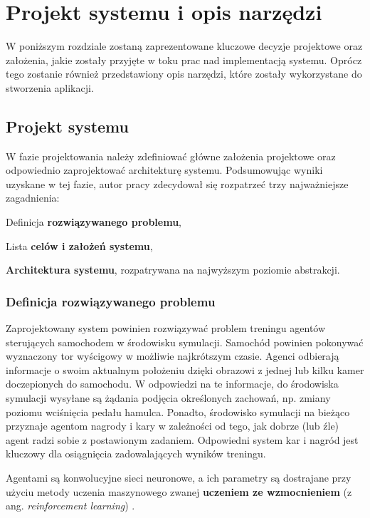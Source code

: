 \chapter{Projekt systemu i opis narzędzi}
\label{DesignSystemChapter}
W poniższym rozdziale zostaną zaprezentowane kluczowe decyzje projektowe oraz założenia, jakie zostały przyjęte w toku prac nad implementacją systemu. Oprócz tego zostanie również przedstawiony opis narzędzi, które zostały wykorzystane do stworzenia aplikacji.

\section{Projekt systemu}
W fazie projektowania należy zdefiniować główne założenia projektowe oraz odpowiednio zaprojektować architekturę systemu. Podsumowując wyniki uzyskane w tej fazie, autor pracy zdecydował się rozpatrzeć trzy najważniejsze zagadnienia:
\begin{enumerate*}
\item Definicja \textbf{rozwiązywanego problemu},
\item Lista \textbf{celów i założeń systemu},
\item \textbf{Architektura systemu}, rozpatrywana na najwyższym poziomie abstrakcji.
\end{enumerate*}

\subsection{Definicja rozwiązywanego problemu}
Zaprojektowany system powinien rozwiązywać problem treningu agentów sterujących samochodem w środowisku symulacji. Samochód powinien pokonywać wyznaczony tor wyścigowy w możliwie najkrótszym czasie. Agenci odbierają informacje o swoim aktualnym położeniu dzięki obrazowi z jednej lub kilku kamer doczepionych do samochodu. W odpowiedzi na te informacje, do środowiska symulacji wysyłane są żądania podjęcia określonych zachowań, np. zmiany poziomu wciśnięcia pedału hamulca. Ponadto, środowisko symulacji na bieżąco przyznaje agentom nagrody i kary w zależności od tego, jak dobrze (lub źle) agent radzi sobie z postawionym zadaniem. Odpowiedni system kar i nagród jest kluczowy dla osiągnięcia zadowalających wyników treningu.

Agentami są konwolucyjne sieci neuronowe, a ich parametry są dostrajane przy użyciu metody uczenia maszynowego zwanej \textbf{uczeniem ze wzmocnieniem} (z ang. \textit{reinforcement learning}) \cite{deepRL:guide}.

